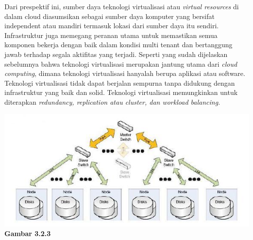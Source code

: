 \tab Dari prespektif ini, sumber daya teknologi virtualisasi atau \textit{virtual resources} di dalam cloud diasumsikan sebagai sumber daya komputer yang bersifat independent atau mandiri termasuk lokasi dari sumber daya itu sendiri.\\
\tab Infrastruktur juga memegang peranan utama untuk memastikan semua komponen bekerja dengan baik dalam kondisi multi tenant dan bertanggung jawab terhadap segala aktifitas yang terjadi. Seperti yang sudah dijelaskan sebelumnya bahwa teknologi virtualisasi merupakan jantung utama dari \textit{cloud computing}, dimana teknologi virtualisasi hanyalah berupa aplikasi atau software. Teknologi virtualisasi tidak dapat berjalan sempurna tanpa didukung dengan infrastruktur yang baik dan solid. Teknologi virtualisasi memungkinkan untuk diterapkan \textit{redundancy, replication atau cluster, dan workload balancing.}\\
\begin{center}
\includegraphics[scale=1]{Gambar323.jpg} \\
\textbf{Gambar 3.2.3}
\end{center}
